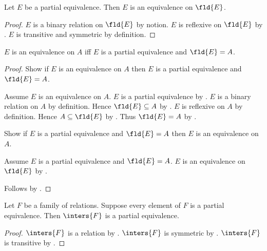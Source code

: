 \begin{proposition}\label{partialequivalence_is_equivalence_on_field}
    Let $E$ be a partial equivalence.
    Then $E$ is an equivalence on $\fld{E}$.
\end{proposition}
\begin{proof}
    $E$ is a binary relation on $\fld{E}$ by notion.
    $E$ is reflexive on $\fld{E}$ by
        .
    $E$ is transitive and symmetric by definition.
\end{proof}

\begin{proposition}\label{equivalence_on_iff_partialequivalence_and_field}
    $E$ is an equivalence on $A$ iff
    $E$ is a partial equivalence and $\fld{E}=A$.
\end{proposition}
\begin{proof}
    Show if $E$ is an equivalence on $A$ then
        $E$ is a partial equivalence and $\fld{E}=A$.
    \begin{subproof}
        Assume $E$ is an equivalence on $A$.
        $E$ is a partial equivalence by
            .
        $E$ is a binary relation on $A$ by definition.
        Hence $\fld{E}\subseteq A$ by
            .
        $E$ is reflexive on $A$ by definition.
        Hence $A\subseteq\fld{E}$ by
            .
        Thus $\fld{E}=A$ by .
    \end{subproof}
    Show if $E$ is a partial equivalence and $\fld{E}=A$ then
        $E$ is an equivalence on $A$.
    \begin{subproof}
        Assume $E$ is a partial equivalence and $\fld{E}=A$.
        $E$ is an equivalence on $\fld{E}$ by
            .
    \end{subproof}
    Follows by \auto.
\end{proof}

\begin{proposition}\label{inters_of_family_of_partial_equivalences_is_partial_equivalence}
    Let $F$ be a family of relations.
    Suppose every element of $F$ is a partial equivalence.
    Then $\inters{F}$ is a partial equivalence.
\end{proposition}
\begin{proof}
    $\inters{F}$ is a relation
        by .
    $\inters{F}$ is symmetric by .
    $\inters{F}$ is transitive by .
\end{proof}

